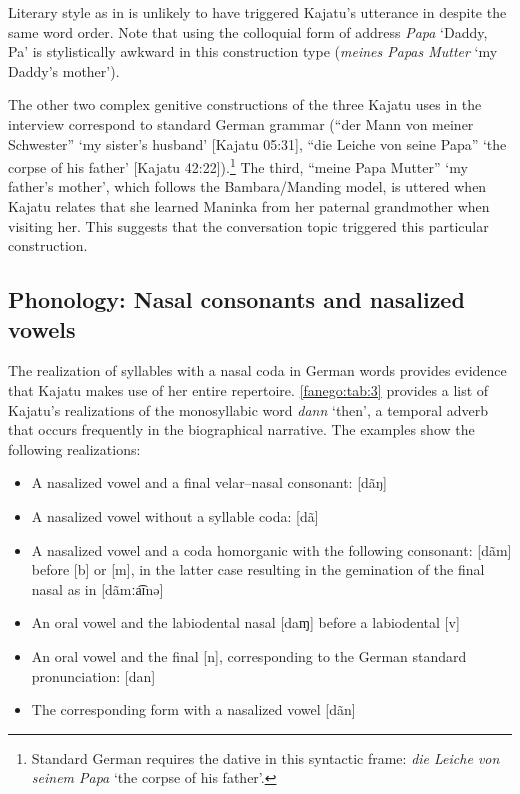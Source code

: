 \documentclass[output=paper]{langscibook}
\begin{document}
\noindent
Literary style as in  is unlikely to have triggered Kajatu’s utterance in  despite the same word order. Note that using the colloquial form of address \textit{Papa} ‘Daddy, Pa’ is stylistically awkward in this construction type (\textit{meines Papas Mutter} ‘my Daddy’s mother’).

The other two complex genitive constructions of the three Kajatu uses in the interview correspond to standard German grammar (“der Mann von meiner Schwester” ‘my sister’s husband’ [Kajatu 05:31], “die Leiche von seine Papa” ‘the corpse of his father’ [Kajatu 42:22]).\footnote{Standard German requires the dative in this syntactic frame: \textit{die Leiche von seinem Papa} ‘the corpse of his father’.} The third, “meine Papa Mutter” ‘my father’s mother’, which follows the Bambara/Manding model, is uttered when Kajatu relates that she learned Maninka from her paternal grandmother when visiting her. This suggests that the conversation topic triggered this particular construction.

\subsection{Phonology: Nasal consonants and nasalized vowels} \label{fanego:sec:5.3}
The realization of syllables with a nasal coda in German words provides evidence that Kajatu makes use of her entire repertoire. \autoref{fanego:tab:3} provides a list of Kajatu’s realizations of the monosyllabic word \textit{dann} ‘then’, a temporal adverb that occurs frequently in the biographical narrative. The examples show the following realizations:
\begin{itemize}
    \item A nasalized vowel and a final velar–nasal consonant: [dãŋ]
    \item A nasalized vowel without a syllable coda: [dã]
    \item A nasalized vowel and a coda homorganic with the following consonant: [dãm] before [b] or [m], in the latter case resulting in the gemination of the final nasal as in [dãmːa͡ɪnə]
    \item An oral vowel and the labiodental nasal [daɱ] before a labiodental [v]
    \item An oral vowel and the final [n], corresponding to the German standard pronunciation: [dan]
    \item The corresponding form with a nasalized vowel [dãn]
\end{itemize}
\end{document}
